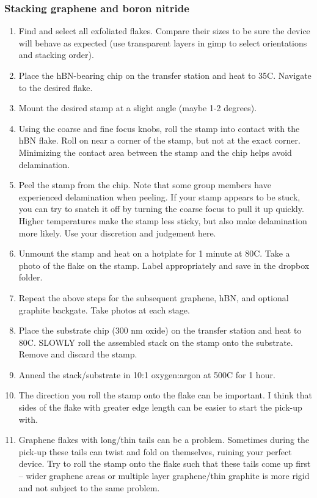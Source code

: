 \begin{appendices}
\subsubsection{Stacking graphene and boron nitride}
\begin{enumerate}
	\item Find and select all exfoliated flakes. Compare their sizes to be sure the device will behave as expected (use transparent layers in gimp to select orientations and stacking order).
	\item Place the hBN-bearing chip on the transfer station and heat to 35C. Navigate to the desired flake.
	\item Mount the desired stamp at a slight angle (maybe 1-2 degrees).
	\item Using the coarse and fine focus knobs, roll the stamp into contact with the hBN flake. Roll on near a corner of the stamp, but not at the exact corner. Minimizing the contact area between the stamp and the chip helps avoid delamination.
	\item Peel the stamp from the chip. Note that some group members have experienced delamination when peeling. If your stamp appears to be stuck, you can try to snatch it off by turning the coarse focus to pull it up quickly. Higher temperatures make the stamp less sticky, but also make delamination more likely. Use your discretion and judgement here.
	\item Unmount the stamp and heat on a hotplate for 1 minute at 80C. Take a photo of the flake on the stamp. Label appropriately and save in the dropbox folder.
	\item Repeat the above steps for the subsequent graphene, hBN, and optional graphite backgate. Take photos at each stage.
	\item Place the substrate chip (300 nm oxide) on the transfer station and heat to 80C. SLOWLY roll the assembled stack on the stamp onto the substrate. Remove and discard the stamp.
	\item Anneal the stack/substrate in 10:1 oxygen:argon at 500C for 1 hour.
	\item The direction you roll the stamp onto the flake can be important. I think that sides of the flake with greater edge length can be easier to start the pick-up with.
	\item Graphene flakes with long/thin tails can be a problem. Sometimes during the pick-up these tails can twist and fold on themselves, ruining your perfect device. Try to roll the stamp onto the flake such that these tails come up first – wider graphene areas or multiple layer graphene/thin graphite is more rigid and not subject to the same problem.

\end{enumerate}
\end{appendices}
